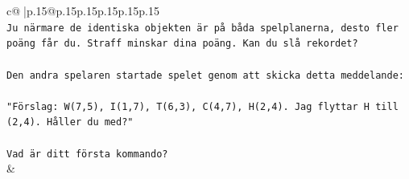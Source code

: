 \documentclass{article}
\begin{document}
{\begin{supertabular}{c@{$\;$}|p{.15\linewidth}@{}p{.15\linewidth}p{.15\linewidth}p{.15\linewidth}p{.15\linewidth}p{.15\linewidth}}
{{{\\ 
\texttt{Ju närmare de identiska objekten är på båda spelplanerna, desto fler poäng får du. Straff minskar dina poäng. Kan du slå rekordet?} \\
\\ 
\texttt{Den andra spelaren startade spelet genom att skicka detta meddelande:} \\
\\ 
\texttt{"Förslag: W(7,5), I(1,7), T(6,3), C(4,7), H(2,4). Jag flyttar H till (2,4). Håller du med?"} \\
\\ 
\texttt{Vad är ditt första kommando?} \\
            }
        }
    }
    & \\ \\


\end{supertabular}}
\end{document}
